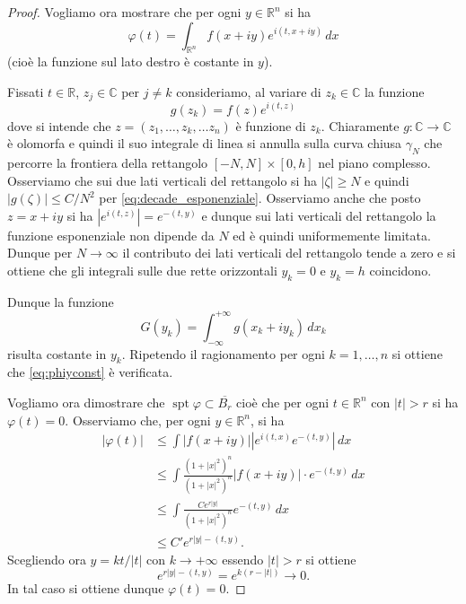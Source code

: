 \documentclass[italian,a4paper,oneside,headinclude]{scrbook}
\renewcommand{\phi}{\varphi}
\newcommand{\CC}{\mathbb C}
\newcommand{\RR}{\mathbb R}
\newcommand{\abs}[1]{{\left|#1\right|}}
\DeclareMathOperator{\spt}{spt}
\begin{document}
\begin{proof}

  Vogliamo ora mostrare che per ogni $y\in \RR^n$ si ha
  \begin{equation}\label{eq:phiyconst}
  \phi(t) = \int_{\RR^n} f(x+i y) e^{i(t,x+iy)}\, dx
  \end{equation}
  (cioè la funzione sul lato destro è costante in $y$).

  Fissati $t\in \RR$, $z_j \in \CC$ per $j\neq k$
  consideriamo, al variare di $z_k\in \CC$ la funzione
  \[
  g(z_k) = f(z) e^{i(t,z)}
  \]
  dove si intende che $z=(z_1, \dots, z_k,\dots z_n)$ è funzione di $z_k$.
  Chiaramente $g\colon \CC\to\CC$ è olomorfa e quindi il suo integrale
  di linea si annulla sulla curva chiusa $\gamma_N$ che percorre la
   frontiera della rettangolo $[-N,N]\times[0,h]$ nel piano complesso.
  Osserviamo che sui due lati verticali del rettangolo si ha
  $\abs{\zeta}\ge N$ e quindi $\abs{g(\zeta)} \le C/N^2$ per
  \eqref{eq:decade_esponenziale}. Osserviamo anche che posto $z=x+iy$
  si ha $\abs{e^{i(t,z)}} = e^{-(t,y)}$ e dunque sui lati verticali
  del rettangolo la funzione esponenziale non dipende da $N$ ed è
  quindi uniformemente limitata.
  Dunque per $N\to \infty$ il contributo dei lati verticali del
  rettangolo tende a zero e si ottiene che gli integrali sulle due
  rette orizzontali $y_k=0$ e $y_k=h$ coincidono.

  Dunque la funzione
  \[
   G(y_k) = \int_{-\infty}^{+\infty} g(x_k+iy_k)\, dx_k
  \]
  risulta costante in $y_k$.
  Ripetendo il ragionamento per ogni $k=1,\dots, n$ si ottiene che
  \eqref{eq:phiyconst} è verificata.

  Vogliamo ora dimostrare che $\spt \phi \subset \overline{B_r}$ cioè
  che per ogni $t\in \RR^n$ con $\abs{t}>r$ si ha $\phi(t)=0$.
  Osserviamo che, per ogni $y\in \RR^n$, si ha
  \begin{align*}
  \abs{\phi(t)}
  &\le \int \abs{f(x+iy)} \abs{e^{i(t,x)}e^{-(t,y)}}\, dx \\
  &\le \int \frac{(1+\abs{x}^2)^n}{(1+\abs{x}^2)^n} \abs{f(x+iy)}
  \cdot e^{-(t,y)}\, dx \\
  &\le \int \frac{C e^{r\abs{y}}}{(1+\abs{x}^2)^n}  e^{-(t,y)} \, dx \\
  &\le C' e^{r\abs{y}-(t,y)}.
  \end{align*}
  Scegliendo ora $y=k t/\abs{t}$ con $k\to +\infty$
  essendo $\abs{t}>r$ si ottiene
  \[
  e^{r\abs{y}-(t,y)} = e^{k(r-\abs{t})} \to 0.
  \]
  In tal caso si ottiene dunque $\phi(t) =0$.


\end{proof}
\end{document}
